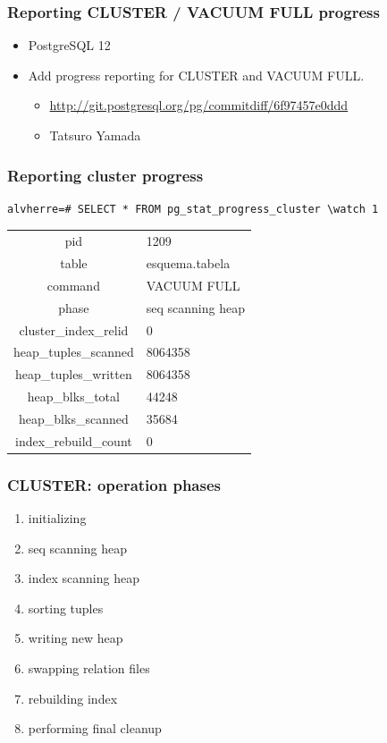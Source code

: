 \documentclass[ignorenonframetext,t]{beamer}
\begin{document}
\begin{frame}
  \frametitle{Reporting CLUSTER / VACUUM FULL progress}

  \begin{itemize}
    \item PostgreSQL 12
    \item Add progress reporting for CLUSTER and VACUUM FULL.
      \begin{itemize}
	\item \url{http://git.postgresql.org/pg/commitdiff/6f97457e0ddd}
	\item Tatsuro Yamada
      \end{itemize}
  \end{itemize}

\end{frame}

\begin{frame}[fragile]
   \frametitle{Reporting cluster progress}

\footnotesize
\begin{verbatim}
alvherre=# SELECT * FROM pg_stat_progress_cluster \watch 1
\end{verbatim}

\noindent 
\begin{tabular}{c|l}
\hline
pid & 1209 \\
table & esquema.tabela \\
command & VACUUM FULL \\
phase & seq scanning heap \\
cluster\_index\_relid & 0 \\
heap\_tuples\_scanned & 8064358 \\
heap\_tuples\_written & 8064358 \\
heap\_blks\_total & 44248 \\
heap\_blks\_scanned & 35684 \\
index\_rebuild\_count & 0 \\
\end{tabular}
\end{frame}

\begin{frame}
  \frametitle{CLUSTER: operation phases}

  \begin{enumerate}
    \item initializing
    \item seq scanning heap
    \item index scanning heap
    \item sorting tuples
    \item writing new heap
    \item swapping relation files
    \item rebuilding index
    \item performing final cleanup
  \end{enumerate}
\end{frame}
\end{document}
